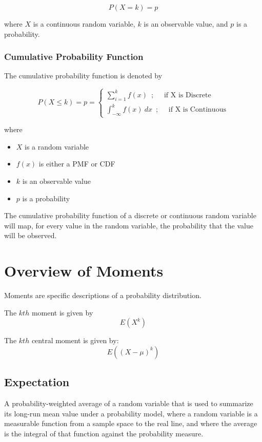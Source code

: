 \documentclass{article}
\begin{document}
$$
P(X=k) = p
$$

where $X$ is a continuous random variable, $k$ is an observable value, and $p$ is a probability.

\subsubsection{Cumulative Probability Function}
The cumulative probability function is denoted by

$$
P(X \leq k) = p = \begin{cases} \sum_{i=1}^{k} f(x) \enspace; \quad \text{ if X is Discrete} \\ \int_{-\infty}^{k} f(x) \: dx \enspace; \quad \text{ if X is Continuous} \end{cases}
$$

where 

\begin{itemize}
    \item $X$ is a random variable
    \item $f(x)$ is either a PMF or CDF
    \item $k$ is an observable value
    \item $p$ is a probability
\end{itemize}

The cumulative probability function of a discrete or continuous random variable will map, for every value in the random variable, the probability that the value will be observed.

\newpage
\section{Overview of Moments}
Moments are specific descriptions of a probability distribution. 

The $kth$ moment is given by
$$
E(X^k)
$$ 

The $kth$ central moment is given by:
$$
E((X-\mu)^k)
$$

\subsection{Expectation}
A probability-weighted average of a random variable that is used to summarize its long-run mean value under a probability model, where a random variable is a measurable function from a sample space to the real line, and where the average is the integral of that function against the probability measure.
\end{document}
